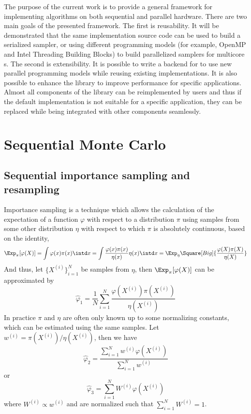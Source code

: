 \documentclass[11pt,bib,mint,hyper,altcolor]{marticle}
\begin{document}
The purpose of the current work is to provide a general framework for
implementing \smc algorithms on both sequential and parallel hardware. There
are two main goals of the presented framework. The first is reusability. It
will be demonstrated that the same implementation source code can be used to
build a serialized sampler, or using different programming models (for example,
OpenMP and Intel Threading Building Blocks) to build parallelized samplers for
multicore \cpu{}s. The second is extensibility. It is possible to write a
backend for \vsmc to use new parallel programming models while reusing existing
implementations. It is also possible to enhance the library to improve
performance for specific applications. Almost all components of the library can
be reimplemented by users and thus if the default implementation is not
suitable for a specific application, they can be replaced while being
integrated with other components seamlessly.

\section{Sequential Monte Carlo}
\label{sec:Sequential Monte Carlo}

\subsection{Sequential importance sampling and resampling}
\label{sub:Sequential importance sampling and resampling}

Importance sampling is a technique which allows the calculation of the
expectation of a function $\varphi$ with respect to a distribution $\pi$ using
samples from some other distribution $\eta$ with respect to which $\pi$ is
absolutely continuous, based on the identity,
\begin{equation}
  \Exp_{\pi}[\varphi(X)]
  = \int\varphi(x)\pi(x)\intd x
  = \int\frac{\varphi(x)\pi(x)}{\eta(x)}\eta(x)\intd x
  = \Exp_{\eta}\Square[Big]{\frac{\varphi(X)\pi(X)}{\eta(X)}}
\end{equation}
And thus, let $\{X^{(i)}\}_{i=1}^N$ be samples from $\eta$, then
$\Exp_{\pi}[\varphi(X)]$ can be approximated by
\begin{equation}
  \hat\varphi_1 =
  \frac{1}{N}\sum_{i=1}^N\frac{\varphi(X^{(i)})\pi(X^{(i)})}{\eta(X^{(i)})}
\end{equation}
In practice $\pi$ and $\eta$ are often only known up to some normalizing
constants, which can be estimated using the same samples. Let $w^{(i)} =
\pi(X^{(i)})/\eta(X^{(i)})$, then we have
\begin{equation}
  \hat\varphi_2 =
  \frac{\sum_{i=1}^Nw^{(i)}\varphi(X^{(i)})}{\sum_{i=1}^Nw^{(i)}}
\end{equation}
or
\begin{equation}
  \hat\varphi_3 = \sum_{i=1}^NW^{(i)}\varphi(X^{(i)})
\end{equation}
where $W^{(i)}\propto w^{(i)}$ and are normalized such that
$\sum_{i=1}^NW^{(i)} = 1$.
\end{document}

